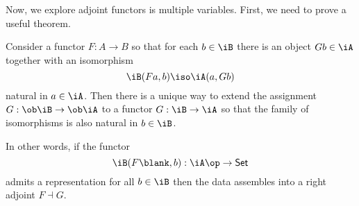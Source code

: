 \documentclass{amsart}
\begin{document}
Now, we explore adjoint functors is multiple variables.
First, we need to prove a useful theorem.

\begin{thm}
  Consider a functor $F : A \to B$ so that for each $b \in \iB$ there is an object $Gb \in \iA$ together with an isomorphism
  \[
    \iB(Fa,b) \iso \iA(a, Gb)
  \]
  natural in $a \in \iA$.
  Then there is a unique way to extend the assignment $G : \ob\iB \to \ob\iA$ to a functor $G : \iB \to \iA$ so that the family of isomorphisms is also natural in $b \in \iB$.

  In other words, if the functor
  \[
    \iB(F\blank, b) : \iA\op \to \mathsf{Set}
  \]
  admits a representation for all $b \in \iB$ then the data assembles into a right adjoint $F \dashv G$.
\end{thm}



\end{document}
